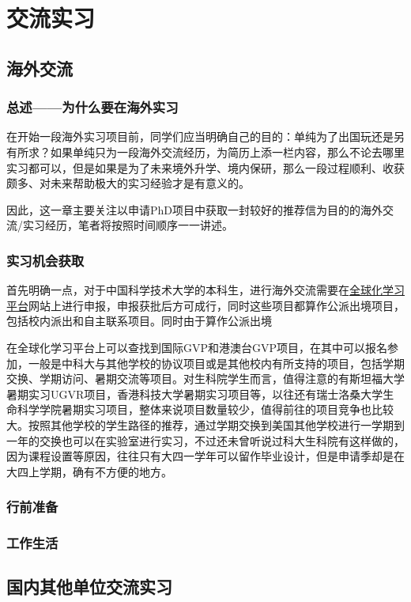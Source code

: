 \chapter{交流实习}

\section{海外交流}
\subsection{总述——为什么要在海外实习}
在开始一段海外实习项目前，同学们应当明确自己的目的：单纯为了出国玩还是另有所求？如果单纯只为一段海外交流经历，为简历上添一栏内容，那么不论去哪里实习都可以，但是如果是为了未来境外升学、境内保研，那么一段过程顺利、收获颇多、对未来帮助极大的实习经验才是有意义的。

因此，这一章主要关注以申请PhD项目中获取一封较好的推荐信为目的的海外交流/实习经历，笔者将按照时间顺序一一讲述。

\subsection{实习机会获取}
首先明确一点，对于中国科学技术大学的本科生，进行海外交流需要在\href{vista.ustc.edu.cn}{全球化学习平台}网站上进行申报，申报获批后方可成行，同时这些项目都算作公派出境项目，包括校内派出和自主联系项目。同时由于算作公派出境

在全球化学习平台上可以查找到国际GVP和港澳台GVP项目，在其中可以报名参加，一般是中科大与其他学校的协议项目或是其他校内有所支持的项目，包括学期交换、学期访问、暑期交流等项目。对生科院学生而言，值得注意的有斯坦福大学暑期实习UGVR项目，香港科技大学暑期实习项目等，以往还有瑞士洛桑大学生命科学学院暑期实习项目，整体来说项目数量较少，值得前往的项目竞争也比较大。按照其他学校的学生路径的推荐，通过学期交换到美国其他学校进行一学期到一年的交换也可以在实验室进行实习，不过还未曾听说过科大生科院有这样做的，因为课程设置等原因，往往只有大四一学年可以留作毕业设计，但是申请季却是在大四上学期，确有不方便的地方。

\subsection{行前准备}
\subsection{工作生活}

\section{国内其他单位交流实习}